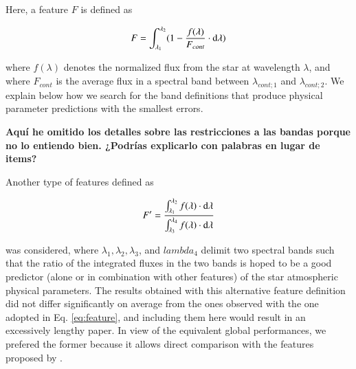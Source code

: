 Here, a feature $F$ is defined as

\begin{equation}\label{eq:feature}
  F = \int_{\lambda_{1}}^{\lambda_{2}} (1-\frac{f(\lambda)}{F_{cont}} \cdot {\rm d}{\lambda})
\end{equation}

where $f(\lambda)$ denotes the normalized flux from the star at
wavelength $\lambda$, and where $F_{cont}$ is the average flux in a
spectral band between $\lambda_{cont;1}$ and $\lambda_{cont;2}$. We
explain below how we search for the band definitions that produce
physical parameter predictions with the smallest errors.

{\bf Aquí he omitido los detalles sobre las restricciones a las bandas
porque no lo entiendo bien. ¿Podrías explicarlo con palabras en lugar
de items?}


Another type of features defined as

\begin{equation}\label{eq:feature2}
  F' = \frac{ \int_{\lambda_{1}}^{\lambda_{2}}f(\lambda) \cdot {\rm d}{\lambda}}
               {\int_{\lambda_{3}}^{\lambda_{4}} f(\lambda) \cdot {\rm d}{\lambda}} 
\end{equation}

was considered, where $\lambda_1, \lambda_2, \lambda_3$, and
$lambda_4$ delimit two spectral bands such that the ratio of the
integrated fluxes in the two bands is hoped to be a good predictor
(alone or in combination with other features) of the star atmospheric
physical parameters. The results obtained with this alternative
feature definition did not differ significantly on average from the
ones observed with the one adopted in Eq. \ref{eq:feature}, and
including them here would result in an excessively lengthy paper. In
view of the equivalent global performances, we prefered the former
because it allows direct comparison with the features proposed
by \cite{cesetti}.

